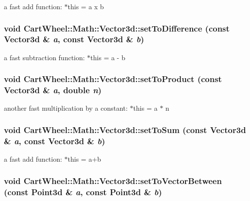 \label{classCartWheel_1_1Math_1_1Vector3d_abfd7864901a584e868f311a9e13bc7c7}
a fast add function: $\ast$this = a x b \hypertarget{classCartWheel_1_1Math_1_1Vector3d_a8d4b497bf732f0d9685cbde6aaacb833}{
\subsubsection[{setToDifference}]{\setlength{\rightskip}{0pt plus 5cm}void CartWheel::Math::Vector3d::setToDifference (const {\bf Vector3d} \& {\em a}, \/  const {\bf Vector3d} \& {\em b})}}
\label{classCartWheel_1_1Math_1_1Vector3d_a8d4b497bf732f0d9685cbde6aaacb833}
a fast subtraction function: $\ast$this = a -\/ b \hypertarget{classCartWheel_1_1Math_1_1Vector3d_af1946753f78a74646b055b8280d95a97}{
\subsubsection[{setToProduct}]{\setlength{\rightskip}{0pt plus 5cm}void CartWheel::Math::Vector3d::setToProduct (const {\bf Vector3d} \& {\em a}, \/  double {\em n})}}
\label{classCartWheel_1_1Math_1_1Vector3d_af1946753f78a74646b055b8280d95a97}
another fast multiplication by a constant: $\ast$this = a $\ast$ n \hypertarget{classCartWheel_1_1Math_1_1Vector3d_a6dcc127ab57cfcd20c72c7fc74153264}{
\subsubsection[{setToSum}]{\setlength{\rightskip}{0pt plus 5cm}void CartWheel::Math::Vector3d::setToSum (const {\bf Vector3d} \& {\em a}, \/  const {\bf Vector3d} \& {\em b})}}
\label{classCartWheel_1_1Math_1_1Vector3d_a6dcc127ab57cfcd20c72c7fc74153264}
a fast add function: $\ast$this = a+b \hypertarget{classCartWheel_1_1Math_1_1Vector3d_a04d88c2c27b0289d67dddbb9247f181d}{
\subsubsection[{setToVectorBetween}]{\setlength{\rightskip}{0pt plus 5cm}void CartWheel::Math::Vector3d::setToVectorBetween (const {\bf Point3d} \& {\em a}, \/  const {\bf Point3d} \& {\em b})}}
